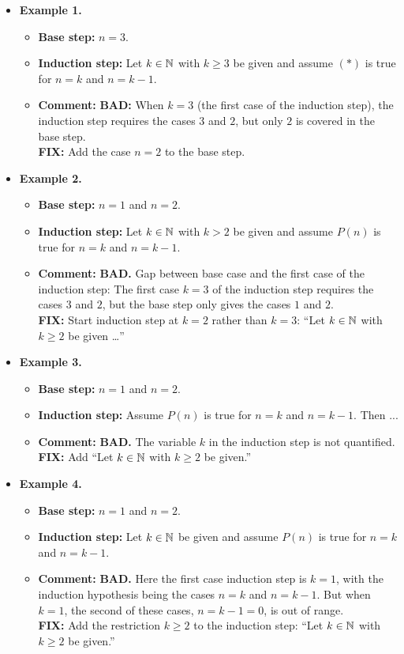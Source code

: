 \begin{itemize}

\item[]  \textbf{Example 1.}
\begin{itemize}
\item \textbf{Base step:} $n=3$.
\item \textbf{Induction step:} Let $k\in \mathbb{N}$ with $k\ge 3$ be given and
assume $(*)$ is true for $n=k$ and $n=k-1$. 
\item \textbf{Comment:}
\textbf{BAD:} When $k=3$ (the first case of the induction step), the induction 
step requires the cases $3$ and $2$, but only $2$ is covered in the base
step.\\
\textbf{FIX:} Add the case $n=2$ to the base step. 
\end{itemize}
\item[]   \textbf{Example 2.}
\begin{itemize}
\item \textbf{Base step:} $n=1$ and $n=2$.
\item \textbf{Induction step:} Let $k\in \mathbb{N}$ with $k>2$ be given and
assume $P(n)$ is true for $n=k$ and $n=k-1$. 
\item \textbf{Comment:}
\textbf{BAD.} Gap between base case and the first case  
of the induction step: The first case $k=3$ of the induction step
requires the cases $3$ and $2$, but the base step only gives the cases
$1$ and $2$.\\
\textbf{FIX:} Start induction step at $k=2$ rather than $k=3$:
``Let $k\in\mathbb{N}$ with $k\ge 2$ be given \dots''
\end{itemize}

\item[]   \textbf{Example 3.}
\begin{itemize}
\item \textbf{Base step:} $n=1$ and $n=2$.
\item \textbf{Induction step:} Assume 
$P(n)$ is true for $n=k$ and $n=k-1$.   Then ...
\item \textbf{Comment:} \textbf{BAD.} The variable $k$ in the  induction
step is not quantified.\\
\textbf{FIX:} Add ``Let $k\in\mathbb{N}$ with $k\ge2$ be given.''
\end{itemize}

\item[]   \textbf{Example 4.}
\begin{itemize}
\item \textbf{Base step:} $n=1$ and $n=2$.
\item \textbf{Induction step:} Let $k\in \mathbb{N}$ be given and
assume $P(n)$ is true for $n=k$ and $n=k-1$.
\item \textbf{Comment:} 
\textbf{BAD.}  Here the first case induction step is $k=1$, with the induction
hypothesis being the cases $n=k$ and $n=k-1$. But when $k=1$, the second of
these cases, $n=k-1=0$, is out of range.\\
\textbf{FIX:} Add the restriction $k\ge2$ to the induction step:
``Let $k\in\mathbb{N}$ with $k\ge2$ be given.''

\end{itemize}

\end{itemize}
